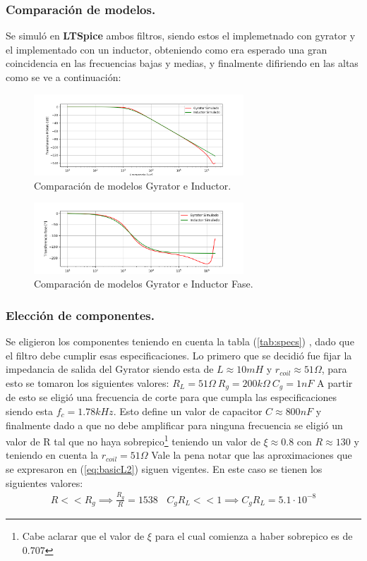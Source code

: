 \documentclass[a4paper]{article}
\begin{document}
\subsubsection{Comparación de modelos.}
Se simuló en \textbf{LTSpice} ambos filtros, siendo estos el implemetnado con gyrator y el implementado con un inductor, obteniendo como era esperado una gran coincidencia en las frecuencias bajas y medias, y finalmente difiriendo en las altas como se ve a continuación:
\begin{figure}[H]	
	\centering
	\includegraphics[width=0.7\textwidth]{ImagenesEj2/simLP.PNG}
	\caption{Comparación de modelos Gyrator e Inductor.}
	\label{fig:gyrIndL}
\end{figure}
\begin{figure}[H]	
	\centering
	\includegraphics[width=0.7\textwidth]{ImagenesEj2/simLPP.PNG}
	\caption{Comparación de modelos Gyrator e Inductor Fase.}
	\label{fig:gyrIndPL}
\end{figure}
\subsubsection{Elección de componentes.}
Se eligieron los componentes teniendo en cuenta la tabla (\ref{tab:specs}) , dado que el filtro debe cumplir esas especificaciones.
Lo primero que se decidió fue fijar la impedancia de salida del Gyrator siendo esta de $L \approx 10mH $ y $r_{coil} \approx 51\Omega $, para esto se tomaron los siguientes valores: $R_L = 51\Omega \ R_g = 200k\Omega \ C_g = 1nF$
A partir de esto se eligió una frecuencia de corte para que cumpla las especificaciones siendo esta  $f_c =1.78kHz $. Esto define un valor de capacitor $C \approx 800nF$ y finalmente dado a que no debe amplificar para ninguna frecuencia se eligió un valor de R tal que no haya sobrepico\footnote{Cabe aclarar que el valor de $\xi$ para el cual comienza a haber sobrepico es de 0.707} teniendo un valor de $\xi \approx 0.8 $ con $R \approx 130 $ y teniendo en cuenta la $r_{coil} = 51\Omega$  
Vale la pena notar que las aproximaciones que se expresaron en (\ref{eq:basicL2}) siguen vigentes. En este caso se tienen los siguientes valores:
\begin{align}  R<<R_g \implies  \frac{R_g}{R}=  1538 \ \ \ \ C_gR_L << 1 \implies C_gR_L =5.1\cdot 10^{-8} \end{align}
\end{document}
